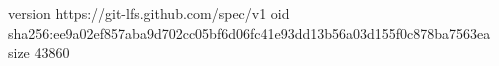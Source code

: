 version https://git-lfs.github.com/spec/v1
oid sha256:ee9a02ef857aba9d702cc05bf6d06fc41e93dd13b56a03d155f0c878ba7563ea
size 43860
